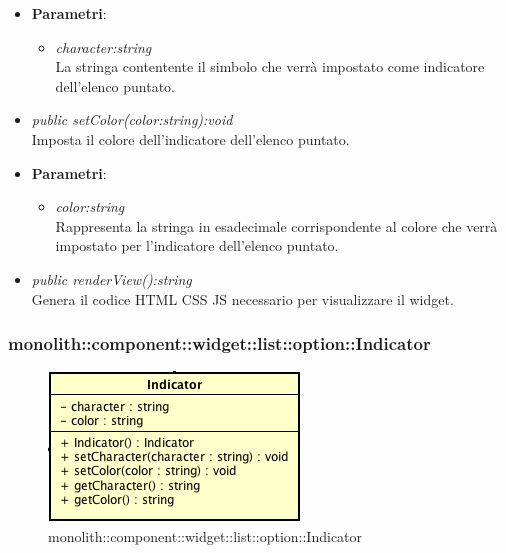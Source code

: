\begin{itemize}
\begin{itemize}
		\item{\textbf{Parametri}: \begin{itemize}
		\item \textit{character:string}\\
		La stringa contentente il simbolo che verrà impostato come indicatore dell'elenco puntato.
		\end{itemize}}
	\item \textit{public setColor(color:string):void}\\
	Imposta il colore dell'indicatore dell'elenco puntato.
		\item{\textbf{Parametri}: \begin{itemize}
		\item \textit{color:string}\\
		Rappresenta la stringa in esadecimale corrispondente al colore che verrà impostato per l'indicatore dell'elenco puntato.
		\end{itemize}}
	\item \textit{public renderView():string}\\
	Genera il codice HTML CSS JS necessario per visualizzare il widget.
	\end{itemize}
\end{itemize}

\subsubsection{monolith::component::widget::list::option::Indicator}

\label{monolith::component::widget::list::option::Indicator}
\begin{figure}[ht]
	\centering
	\includegraphics[scale=0.5]{Sezioni/SottosezioniST/img/Indicator.png}
	\caption{monolith::component::widget::list::option::Indicator}
\end{figure}

